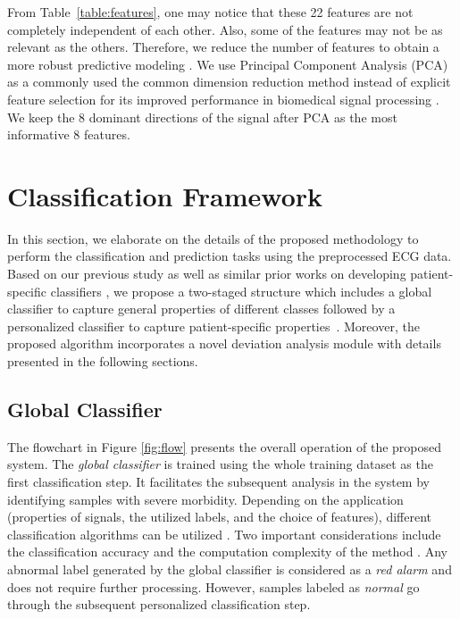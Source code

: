 From Table~\ref{table:features}, one may notice that these 22 features are not completely independent of each other. Also, some of the features may not be as relevant as the others. Therefore, we reduce the number of features to obtain a more robust predictive modeling \cite{autofs, llamedo2012automatic}. We use Principal Component Analysis (PCA) %
as a commonly used the common dimension reduction method instead of explicit feature selection for its improved performance in biomedical signal processing \cite{castells2007principal}. We keep the 8 dominant directions of the signal after PCA as the most informative 8 features.



\section{Classification Framework}


In this section, we elaborate on the details of the proposed methodology to perform the classification and prediction tasks using the preprocessed ECG data. Based on our previous study \cite{chen2018predictive} as well as similar prior works on developing patient-specific classifiers \cite{Hu_et_al,deChazal2006,llamedo2012automatic}, we propose a two-staged structure which includes a global classifier to capture general properties of different classes followed by a personalized classifier to capture patient-specific properties~\cite{chen2018predictive,Hu_et_al,deChazal2006,llamedo2012automatic}. Moreover, the proposed algorithm incorporates a novel deviation analysis module with details presented in the following sections. 

\subsection{Global Classifier}

The flowchart in Figure \ref{fig:flow} presents the overall operation of the proposed system. The \textit{global classifier} is trained using the whole training dataset as the first classification step. It facilitates the subsequent analysis in the system by identifying samples with severe morbidity. Depending on the application (properties of signals, the utilized labels, and the choice of features), different classification algorithms can be utilized \cite{Hu_et_al,llamedo2012automatic}. Two important considerations include the classification accuracy and the computation complexity of the method \cite{llamedo2012automatic}. Any abnormal label generated by the global classifier is considered as a \textit{red alarm} and does not require further processing. However, samples labeled as \textit{normal} go through the subsequent personalized classification step. 

